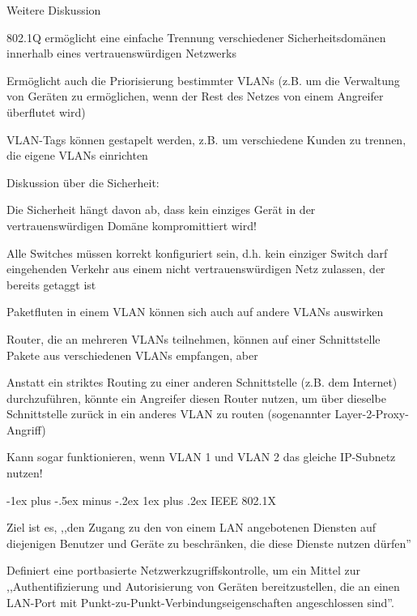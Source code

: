 \documentclass[a4paper]{article}
\makeatletter
\renewcommand{\subsubsection}{\@startsection{subsubsection}{3}{0mm}%
 {-1ex plus -.5ex minus -.2ex}%
 {1ex plus .2ex}%
 {\normalfont\small\bfseries}}
\makeatother
\begin{document}
\begin{multicols}{3}
      Weitere Diskussion
      \begin{itemize*}
            \item 802.1Q ermöglicht eine einfache Trennung verschiedener Sicherheitsdomänen innerhalb eines vertrauenswürdigen Netzwerks
            \begin{itemize*}
                  \item Ermöglicht auch die Priorisierung bestimmter VLANs (z.B. um die Verwaltung von Geräten zu ermöglichen, wenn der Rest des Netzes von einem Angreifer überflutet wird)
                  \item VLAN-Tags können gestapelt werden, z.B. um verschiedene Kunden zu trennen, die eigene VLANs einrichten
            \end{itemize*}
            \item Diskussion über die Sicherheit:
            \begin{itemize*}
                  \item Die Sicherheit hängt davon ab, dass kein einziges Gerät in der vertrauenswürdigen Domäne kompromittiert wird!
                  \item Alle Switches müssen korrekt konfiguriert sein, d.h. kein einziger Switch darf eingehenden Verkehr aus einem nicht vertrauenswürdigen Netz zulassen, der bereits getaggt ist
                  \item Paketfluten in einem VLAN können sich auch auf andere VLANs auswirken
                  \item Router, die an mehreren VLANs teilnehmen, können auf einer Schnittstelle Pakete aus verschiedenen VLANs empfangen, aber
                  \item Anstatt ein striktes Routing zu einer anderen Schnittstelle (z.B. dem Internet) durchzuführen, könnte ein Angreifer diesen Router nutzen, um über dieselbe Schnittstelle zurück in ein anderes VLAN zu routen (sogenannter Layer-2-Proxy-Angriff)
                  \item Kann sogar funktionieren, wenn VLAN 1 und VLAN 2 das gleiche IP-Subnetz nutzen!
            \end{itemize*}
      \end{itemize*}

      \subsubsection{IEEE 802.1X}
      \begin{itemize*}
            \item Ziel ist es, ,,den Zugang zu den von einem LAN angebotenen Diensten auf diejenigen Benutzer und Geräte zu beschränken, die diese Dienste nutzen dürfen''
            \item Definiert eine portbasierte Netzwerkzugriffskontrolle, um ein Mittel zur ,,Authentifizierung und Autorisierung von Geräten bereitzustellen, die an einen LAN-Port mit Punkt-zu-Punkt-Verbindungseigenschaften angeschlossen sind''.
      \end{itemize*}


\end{multicols}
\end{document}
